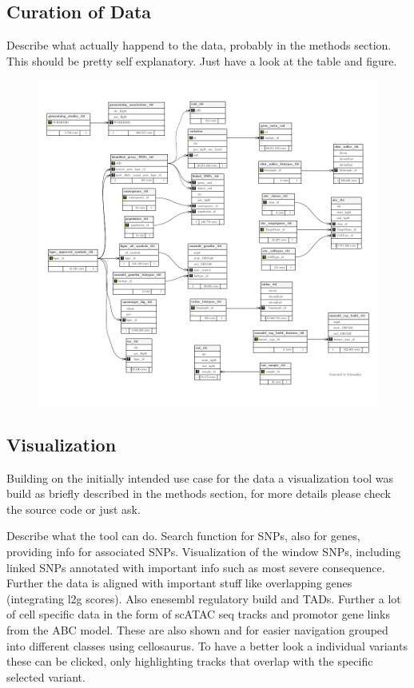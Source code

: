     \subsection{Curation of Data}
    Describe what actually happend to the data, probably in the methods section.
    This should be pretty self explanatory. Just have a look at the table and figure.

    \begin{figure}[h]
    \capstart
        \centering
    	\includegraphics{Abbildung/db-schema.pdf}

    	\begin{minipage}{\captionwidth}
    		\caption[database]{}
    		\label{fig:db}
    	\end{minipage}
    \end{figure}

    \subsection{Visualization}
    \label{subsec:result_vis}
    Building on the initially intended use case for the data a visualization tool was build as briefly described in the methods section, for more details please check the source code or just ask.

    Describe what the tool can do. Search function for SNPs, also for genes, providing info for associated SNPs. Visualization of the window SNPs, including linked SNPs annotated with important info such as most severe consequence. Further the data is aligned with important stuff like overlapping genes (integrating l2g scores). Also enesembl regulatory build and TADs. Further a lot of cell specific data in the form of scATAC seq tracks and promotor gene links from the ABC model. These are also shown and for easier navigation grouped into different classes using cellosaurus. To have a better look a individual variants these can be clicked, only highlighting tracks that overlap with the specific selected variant.

